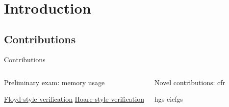 \section{Introduction}

\subsection{Contributions}

\begin{frame}{Contributions}
  \begin{columns}
    \begin{block}{Preliminary exam: memory usage}
      \begin{outline}
        \1 \hyperlink{floyd}{Floyd-style verification}
        \1 \hyperlink{hoare}{Hoare-style verification}
      \end{outline}
    \end{block}

    \begin{block}{Novel contributions: \gls{cfr}}
      \begin{outline}
        \1 \Glspl{hg}
        \1 \Glspl{eicfg}
      \end{outline}
    \end{block}
  \end{columns}
\end{frame}

